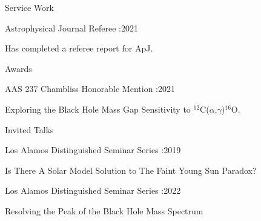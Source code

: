 \documentclass{resume} %
\begin{document}






\begin{rSection}{Service Work}

\begin{rSubsection}{Astrophysical Journal Referee  :}{2021}{}
\item Has completed a referee report for ApJ. 

\end{rSubsection}
\end{rSection}


\begin{rSection}{Awards}

\begin{rSubsection}{AAS 237 Chambliss Honorable Mention :}{2021}{}
\item Exploring the Black Hole Mass Gap Sensitivity to $^{12}$C($\alpha$,$\gamma$)$^{16}$O. 
\end{rSubsection}
\end{rSection}




\begin{rSection}{Invited Talks}

\begin{rSubsection}{Los Alamos Distinguished Seminar Series :}{2019}{}
\item Is There A Solar Model Solution to The Faint Young Sun Paradox? 
\end{rSubsection}
\begin{rSubsection}{Los Alamos Distinguished Seminar Series :}{2022}{}
\item Resolving the Peak of the Black Hole Mass Spectrum 
\end{rSubsection}
\end{rSection}
\end{document}
